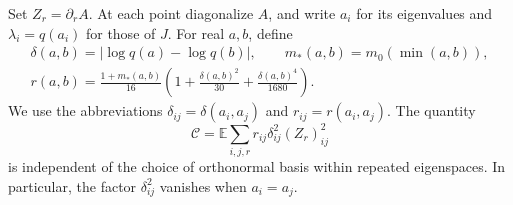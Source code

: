 \documentclass[11pt]{article}
\theoremstyle{definition}
\theoremstyle{remark}
\numberwithin{equation}{section}
\begin{document}
Set $Z_r=\partial_r A$.  At each point diagonalize $A$, and write
$a_i$ for its eigenvalues and $\lambda_i=q(a_i)$ for those of $J$.
For real $a,b$, define
\begin{equation}\label{tr:surplus-weight}
 \begin{gathered}
 \delta(a,b)=|\log q(a)-\log q(b)|,\qquad
 m_*(a,b)=m_0(\min(a,b)),\\
 r(a,b)=\frac{1+m_*(a,b)}{16}
    \left(1+\frac{\delta(a,b)^2}{30}
             +\frac{\delta(a,b)^4}{1680}\right).
 \end{gathered}
\end{equation}
We use the abbreviations $\delta_{ij}=\delta(a_i,a_j)$ and
$r_{ij}=r(a_i,a_j)$.  The quantity
\begin{equation}\label{tr:surplus-definition}
 \mathcal C=\mathbb E\sum_{i,j,r}
           r_{ij}\delta_{ij}^2(Z_r)_{ij}^2
\end{equation}
is independent of the choice of orthonormal basis within repeated
eigenspaces.  In particular, the factor $\delta_{ij}^2$ vanishes when
$a_i=a_j$.
\end{document}
